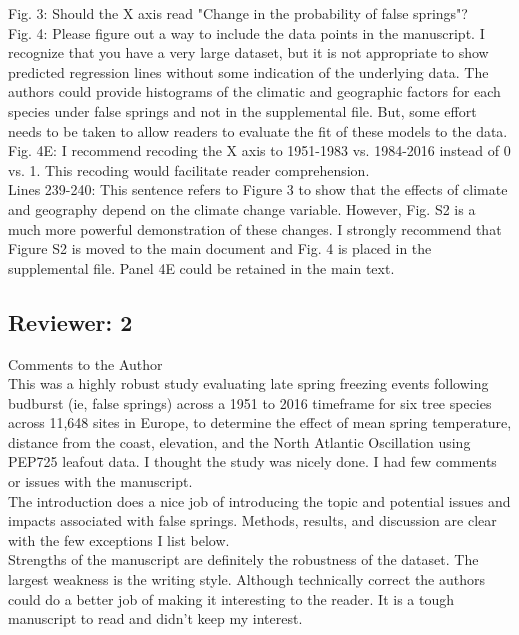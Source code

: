 \documentclass[11pt,a4paper]{article}
\begin{document}
Fig. 3: Should the X axis read "Change in the probability of false springs"?\\

Fig. 4: Please figure out a way to include the data points in the manuscript. I recognize that you have a very large dataset, but it is not appropriate to show predicted regression lines without some indication of the underlying data. The authors could provide histograms of the climatic and geographic factors for each species under false springs and not in the supplemental file. But, some effort needs to be taken to allow readers to evaluate the fit of these models to the data.\\

Fig. 4E: I recommend recoding the X axis to 1951-1983 vs. 1984-2016 instead of 0 vs. 1. This recoding would facilitate reader comprehension.\\

Lines 239-240: This sentence refers to Figure 3 to show that the effects of climate and geography depend on the climate change variable. However, Fig. S2 is a much more powerful demonstration of these changes. I strongly recommend that Figure S2 is moved to the main document and Fig. 4 is placed in the supplemental file. Panel 4E could be retained in the main text.\\

\subsection*{Reviewer: 2}

Comments to the Author\\
This was a highly robust study evaluating late spring freezing events following budburst (ie, false springs) across a 1951 to 2016 timeframe for six tree species across 11,648 sites in Europe, to determine the effect of mean spring temperature, distance from the coast, elevation, and the North Atlantic Oscillation using PEP725 leafout data. I thought the study was nicely done. I had few comments or issues with the manuscript.\\

The introduction does a nice job of introducing the topic and potential issues and impacts associated with false springs.  Methods, results, and discussion are clear with the few exceptions I list below. \\

Strengths of the manuscript are definitely the robustness of the dataset.  The largest weakness  is the writing style.  Although technically correct the authors could do a better job of making it interesting to the reader. It is a tough manuscript to read and didn't keep my interest.   \\
\end{document}
